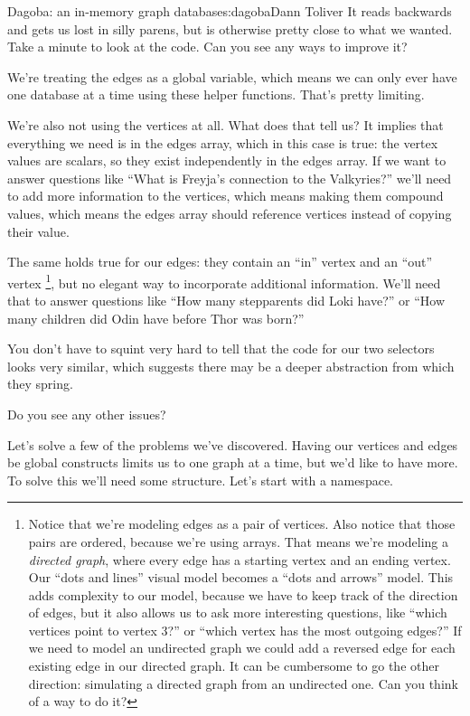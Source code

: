 \begin{aosachapter}{Dagoba: an in-memory graph database}{s:dagoba}{Dann Toliver}
It reads backwards and gets us lost in silly parens, but is otherwise
pretty close to what we wanted. Take a minute to look at the code. Can
you see any ways to improve it?

We're treating the edges as a global variable, which means we can only
ever have one database at a time using these helper functions. That's
pretty limiting.

We're also not using the vertices at all. What does that tell us? It
implies that everything we need is in the edges array, which in this
case is true: the vertex values are scalars, so they exist independently
in the edges array. If we want to answer questions like ``What is
Freyja's connection to the Valkyries?'' we'll need to add more
information to the vertices, which means making them compound values,
which means the edges array should reference vertices instead of copying
their value.

The same holds true for our edges: they contain an ``in'' vertex and an
``out'' vertex \footnote{Notice that we're modeling edges as a pair of
  vertices. Also notice that those pairs are ordered, because we're
  using arrays. That means we're modeling a \emph{directed graph}, where
  every edge has a starting vertex and an ending vertex. Our ``dots and
  lines'' visual model becomes a ``dots and arrows'' model. This adds
  complexity to our model, because we have to keep track of the
  direction of edges, but it also allows us to ask more interesting
  questions, like ``which vertices point to vertex 3?'' or ``which
  vertex has the most outgoing edges?'' If we need to model an
  undirected graph we could add a reversed edge for each existing edge
  in our directed graph. It can be cumbersome to go the other direction:
  simulating a directed graph from an undirected one. Can you think of a
  way to do it?}, but no elegant way to incorporate additional
information. We'll need that to answer questions like ``How many
stepparents did Loki have?'' or ``How many children did Odin have before
Thor was born?''

You don't have to squint very hard to tell that the code for our two
selectors looks very similar, which suggests there may be a deeper
abstraction from which they spring.

Do you see any other issues?

\label{build-a-better-graph}

Let's solve a few of the problems we've discovered. Having our vertices
and edges be global constructs limits us to one graph at a time, but
we'd like to have more. To solve this we'll need some structure. Let's
start with a namespace.


\end{aosachapter}
